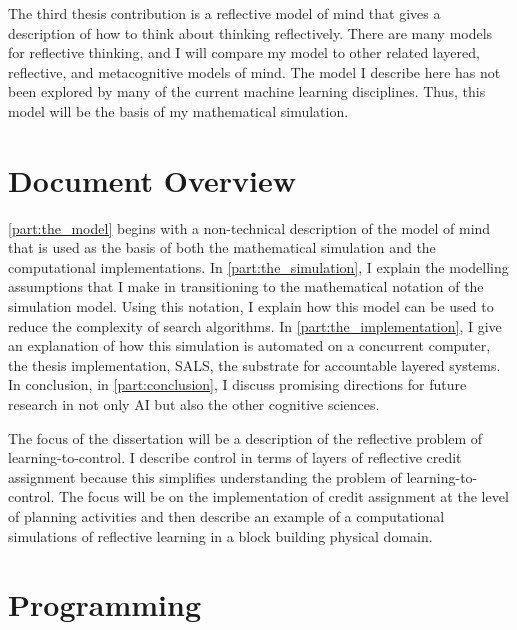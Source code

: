 The third thesis contribution is a reflective model of mind that gives
a description of how to think about thinking reflectively.  There are
many models for reflective thinking, and I will compare my model to
other related layered, reflective, and metacognitive models of mind.
The model I describe here has not been explored by many of the current
machine learning disciplines.  Thus, this model will be the basis of
my mathematical simulation.

\section{Document Overview}

{\mbox{\autoref{part:the_model}}} begins with a non-technical
description of the model of mind that is used as the basis of both the
mathematical simulation and the computational implementations.  In
{\mbox{\autoref{part:the_simulation}}}, I explain the modelling
assumptions that I make in transitioning to the mathematical notation
of the simulation model.  Using this notation, I explain how this
model can be used to reduce the complexity of search algorithms.  In
{\mbox{\autoref{part:the_implementation}}}, I give an explanation of
how this simulation is automated on a concurrent computer, the thesis
implementation, SALS, the substrate for accountable layered systems.
In conclusion, in {\mbox{\autoref{part:conclusion}}}, I discuss
promising directions for future research in not only AI but also the
other cognitive sciences.

The focus of the dissertation will be a description of the reflective
problem of learning-to-control.  I describe control in terms of layers
of reflective credit assignment because this simplifies understanding
the problem of learning-to-control.  The focus will be on the
implementation of credit assignment at the level of planning
activities and then describe an example of a computational simulations
of reflective learning in a block building physical domain.

\section{Programming}

